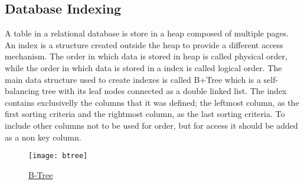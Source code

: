 \documentclass[../../main.tex]{subfiles}
\begin{document}
\subsection{Database Indexing}
A table in a relational database is store in a heap composed of multiple pages.
An index is a structure created outside the heap to provide a different access mechanism.
The order in which data is stored in heap is called physical order, while the order in
which data is stored in a index is called logical order. The main data structure used to
create indexes is called B+Tree which is a self-balancing tree with its leaf nodes
connected as a double linked list. The index contains exclusivelly the columns that it
was defined; the leftmost column, as the first sorting criteria and the rightmost
column, as the last sorting criteria. To include other columns not to be used for order,
but for access it should be added as a non key column.
\begin{figure}
    \centering
    \texttt{[image: btree]}
    \caption{\href{https://use-the-index-luke.com/sql/where-clause/the-equals-operator/concatenated-keys}{B-Tree}}
\end{figure}
\end{document}

